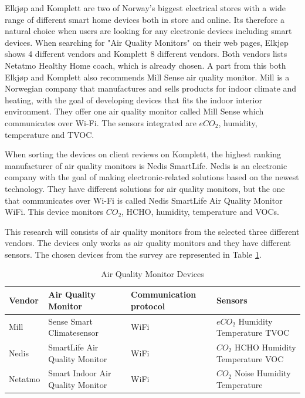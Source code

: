 Elkjøp \cite{Elkjøp} and Komplett \cite{Komplett} are two of Norway's biggest electrical stores with a wide range of different smart home devices both in store and online. Its therefore a natural choice when users are looking for any electronic devices including smart devices. When searching for "Air Quality Monitors" on their web pages, Elkjøp shows 4 different vendors and Komplett 8 different vendors. Both vendors lists Netatmo Healthy Home coach, which is already chosen. A part from this both Elkjøp and Komplett also recommends Mill Sense air quality monitor. Mill \cite{Mill} is a Norwegian company that manufactures and sells products for indoor climate and heating, with the goal of developing devices that fits the indoor interior environment. They offer one air quality monitor called Mill Sense which communicates over \gls{Wi-Fi}. The sensors integrated are \(eCO_2\), humidity, temperature and \gls{TVOC}.

When sorting the devices on client reviews on Komplett, the highest ranking manufacturer of air quality monitors is Nedis SmartLife\cite{Komplett}. Nedis \cite{Nedis} is an electronic company with the goal of making electronic-related solutions based on the newest technology. They have different solutions for air quality monitors, but the one that communicates over \gls{Wi-Fi} is called Nedis SmartLife Air Quality Monitor WiFi. This device monitors \(CO_2\), HCHO, humidity, temperature and VOCs. 

This research will consists of air quality monitors from the selected three different vendors. The devices only works as air quality monitors and they have different sensors. The chosen devices from the survey are represented in Table \ref{tab:AQMSurvey}. 

\begin{table}[H]
    \centering
    \caption{Air Quality Monitor Devices}
    \begin{tabular}{| p{1.5cm} | p{5.5cm} | p{3cm} | p{2cm} |} 
        \hline
        \textbf{Vendor} & \textbf{Air Quality Monitor} & \textbf{Communication protocol} & \textbf{Sensors} \\
        \hline
        Mill & Sense Smart Climatesensor & WiFi & \(eCO_2\) \newline Humidity \newline Temperature \newline \gls{TVOC} \\
        \hline
        Nedis & SmartLife Air Quality Monitor & WiFi & \(CO_2\) \newline HCHO \newline Humidity \newline Temperature \newline VOC \\
        \hline
        Netatmo & Smart Indoor Air Quality Monitor & WiFi & \(CO_2\) \newline Noise \newline Humidity \newline Temperature \\
        \hline
    \end{tabular}
    \label{tab:AQMSurvey}
\end{table}


